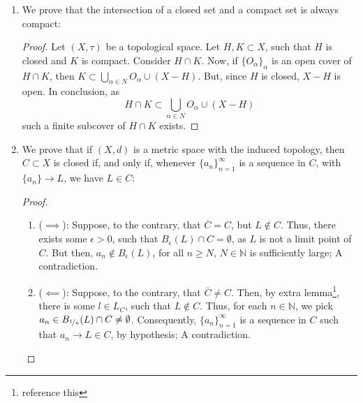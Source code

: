 \documentclass{book}
\begin{document}
\begin{enumerate}[(1)]
    \item We prove that the intersection of a closed set and a compact set is always compact: 
        \begin{proof} Let $(X, \tau)$ be a topological space. Let $H,K \subset X$, such that $H$ is closed and $K$ is compact. Consider $H \cap K$. Now, if $\{O_{\alpha}\}_{\alpha}$ is an open cover of $H \cap K$, then $K \subset \bigcup_{\alpha \in N} O_\alpha \cup (X - H)$. But, since $H$ is closed, $X - H$ is open. In conclusion, as 
            $$H \cap K \subset \bigcup_{\alpha \in N} O_\alpha \cup (X - H)$$
            such a finite subcover of $H \cap K$ exists. 
        \end{proof}

    \item We prove that if $(X, d)$ is a metric space with the induced topology, then $C \subset X$ is closed if, and only if, whenever $\{a_n\}_{n=1}^\infty$ is a sequence in $C$, with $\{a_n\} \rightarrow L$, we have $L \in C$: 
        \begin{proof} 
            \begin{enumerate}
                    $ $\newline
                \item[] ($\implies$): Suppose, to the contrary, that $\overline{C} = C$, but $L \notin C$. Thus, there exists some $\epsilon > 0$, such that $B_\epsilon(L) \cap C = \emptyset$, as $L$ is not a limit point of $C$. But then, $a_n \notin B_\epsilon(L)$, for all $n \geq N$, $N \in \mathbb{N}$ is sufficiently large; A contradiction. 
                \item[] ($\impliedby$): Suppose, to the contrary, that $\overline{C} \neq C$. Then, by extra lemma\footnote{reference this}, there is some $l \in L_C$, such that $L \notin C$. Thus, for each $n \in \mathbb{N}$, we pick $a_n \in B_{\nicefrac{1}{n}}(L) \cap C \neq \emptyset$. Consequently, $\{a_n\}_{n=1}^\infty$ is a sequence in $C$ such that $a_n \rightarrow L \in C$, by hypothesis; A contradiction.
            \end{enumerate}
        \end{proof}

\end{enumerate}
\end{document}
